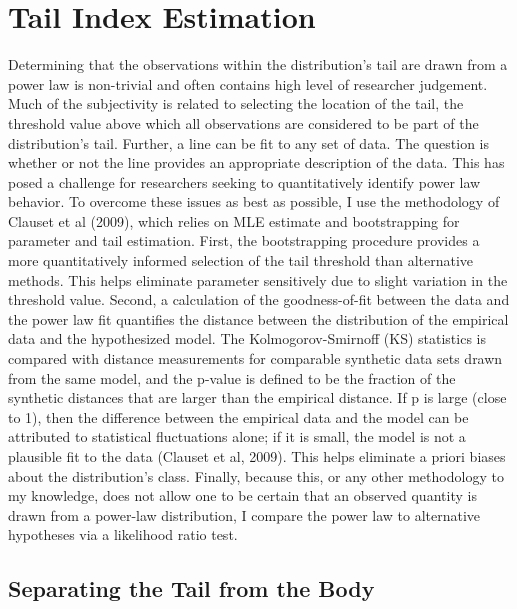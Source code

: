 \documentclass[11pt,a4paper,oldfontcommands]{memoir}
\begin{document}
{\section{Tail Index Estimation}

Determining that the observations within the distribution's tail are drawn from a power law is non-trivial and often contains high level of researcher judgement. Much of the subjectivity is related to selecting the location of the tail, the threshold value above which all observations are considered to be part of the distribution's tail. Further, a line can be fit to any set of data. The question is whether or not the line provides an appropriate description of the data. This has posed a challenge for researchers seeking to quantitatively identify power law behavior. To overcome these issues as best as possible, I use the methodology of Clauset et al (2009), which relies on MLE estimate and bootstrapping for parameter and tail estimation. First, the bootstrapping procedure provides a more quantitatively informed selection of the tail threshold than alternative methods. This helps eliminate parameter sensitively due to slight variation in the threshold value. Second, a calculation of the goodness-of-fit between the data and the power law fit quantifies the distance between the distribution of the empirical data and the hypothesized model. The Kolmogorov-Smirnoff (KS) statistics is compared with distance measurements for comparable synthetic data sets drawn from the same model, and the p-value is defined to be the fraction of the synthetic distances that are larger than the empirical distance. If p is large (close to 1), then the difference between the empirical data and the model can be attributed to statistical fluctuations alone; if it is small, the model is not a plausible fit to the data (Clauset et al, 2009). This helps eliminate a priori biases about the distribution's class. Finally, because this, or any other methodology to my knowledge, does not allow one to be certain that an observed quantity is drawn from a power-law distribution, I compare the power law to alternative hypotheses via a likelihood ratio test.  

\subsection{Separating the Tail from the Body}

}
\end{document}
